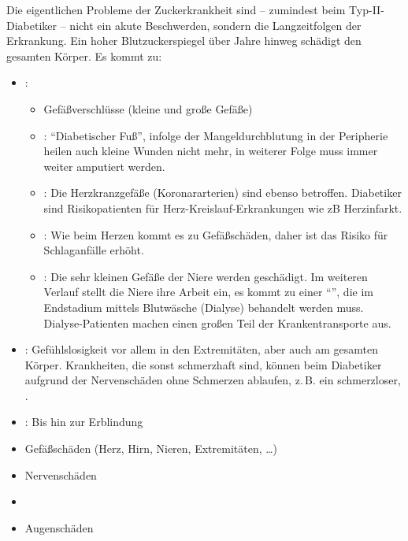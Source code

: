 {%
Die eigentlichen Probleme der Zuckerkrankheit sind -- zumindest 
beim Typ-II-Diabetiker -- nicht ein akute Beschwerden, sondern 
die Langzeitfolgen der Erkrankung.
Ein hoher Blutzuckerspiegel über Jahre hinweg schädigt den gesamten
Körper. Es kommt zu:
\begin{itemize}
  \item {}: 
  \begin{itemize}
    \item Gefäßverschlüsse (kleine und große Gefäße)
    \item {}: \enquote{Diabetischer Fuß}, infolge der
    Mangeldurchblutung in der Peripherie heilen auch kleine
    Wunden nicht mehr, in weiterer Folge muss immer weiter
    amputiert werden.
    \item {}: Die Herzkranzgefäße (Koronar\-arterien)
    sind ebenso betroffen. Diabetiker sind Risikopatienten
    für Herz-Kreislauf-Erkrankungen wie zB Herz\-infarkt.
    \item {}: Wie beim Herzen kommt es zu
    Gefäßschäden, daher ist das Risiko für
    Schlaganfälle erhöht.
    \item {}: Die sehr kleinen Gefäße der Niere
    werden geschädigt. Im weiteren Verlauf stellt die Niere
    ihre Arbeit ein, es kommt zu einer
    \enquote{}, die im
    Endstadium mittels Blutwäsche (Dialyse) behandelt werden
    muss. Dialyse-Patienten machen einen großen Teil der
    Krankentransporte aus.
  \end{itemize}
  \item  {} :
  Gefühlslosigkeit vor allem in den Extremitäten, aber auch am
  gesamten Körper. Krankheiten, die sonst schmerzhaft sind,
  können beim Diabetiker aufgrund der Nervenschäden ohne
  Schmerzen ablaufen, z.\,B. ein schmerzloser, .
  \item  {}: Bis hin zur Erblindung
\end{itemize}
}{
\begin{itemize}
  \item Gefäßschäden (Herz, Hirn, Nieren, Extremitäten, \ldots)
  \item Nervenschäden
  \item {}
  \item Augenschäden
\end{itemize}
}{}{}{}



